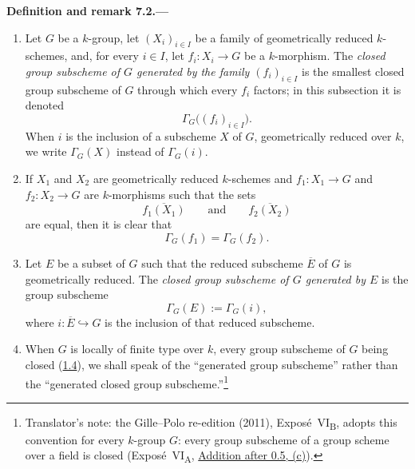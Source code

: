 \par
\ifdim\dimexpr\pagegoal-\pagetotal\relax<12\baselineskip
  \newpage
\fi
\medskip
{}\label{defrem:sga3-VIB-7.2}%
\noindent\textbf{Definition and remark 7.2.---}
\begin{enumerate}
\item[\textup{(i)}]\label{def:sga3-VIB-7.2-i}
  Let \(G\) be a \(k\)-group, let \((X_i)_{i\in I}\) be a
  family of geometrically reduced \(k\)-schemes, and, for every
  \(i\in I\), let \(f_i:X_i\to G\) be a \(k\)-morphism. The
  \emph{closed group subscheme of \(G\) generated by the family
  \((f_i)_{i\in I}\)} is the smallest closed group subscheme of
  \(G\) through which every \(f_i\) factors; in this subsection
  it is denoted
  \[
    \Gamma_G\bigl((f_i)_{i\in I}\bigr).
  \]
  When \(i\) is the inclusion of a subscheme \(X\) of \(G\),
  geometrically reduced over \(k\), we write \(\Gamma_G(X)\)
  instead of \(\Gamma_G(i)\).

\item[\textup{(ii)}]\label{rem:sga3-VIB-7.2-ii}
  If \(X_1\) and \(X_2\) are geometrically reduced
  \(k\)-schemes and \(f_1:X_1\to G\) and \(f_2:X_2\to G\) are
  \(k\)-morphisms such that the sets
  \[
    \overline{f_1(X_1)}
    \qquad\text{and}\qquad
    \overline{f_2(X_2)}
  \]
  are equal, then it is clear that
  \[
    \Gamma_G(f_1)=\Gamma_G(f_2).
  \]

\item[\textup{(iii)}]\label{def:sga3-VIB-7.2-iii}
  Let \(E\) be a subset of \(G\) such that the reduced
  subscheme \(\overline E\) of \(G\) is geometrically reduced.
  The \emph{closed group subscheme of \(G\) generated by \(E\)}
  is the group subscheme
  \[
    \Gamma_G(E):=\Gamma_G(i),
  \]
  where \(i:\overline E\hookrightarrow G\) is the inclusion of
  that reduced subscheme.

\item[\textup{(iv)}]\label{rem:sga3-VIB-7.2-iv}
  When \(G\) is locally of finite type over \(k\), every group
  subscheme of \(G\) being closed (\hyperref[prop:sga3-VIB-1.4]{1.4}),
  we shall speak of the ``generated group subscheme'' rather
  than the ``generated closed group subscheme.''\footnote{Translator's note: the Gille--Polo re-edition (2011),
  Exposé~VI\textsubscript{B}, adopts this convention for every \(k\)-group \(G\): every group subscheme of a
  group scheme over a field is closed (Exposé~VI\textsubscript{A}, \hyperref[sga3:VIA:0.5.2]{Addition after 0.5,
  (c)}).}


\end{enumerate}
